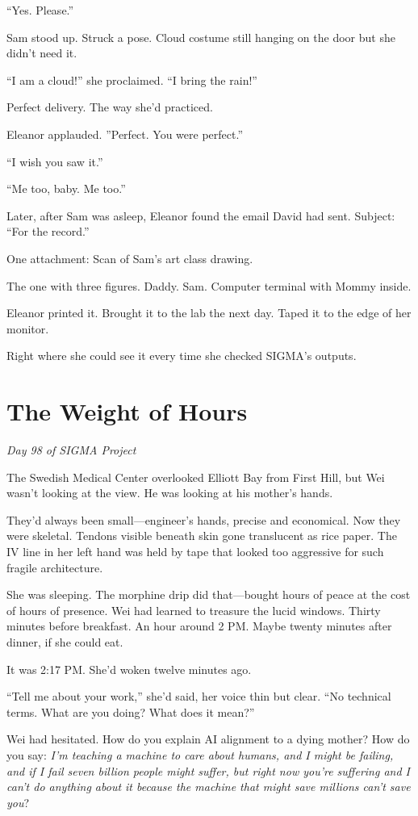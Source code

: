 ``Yes. Please.''

Sam stood up. Struck a pose. Cloud costume still hanging on the door but she didn't need it.

``I am a cloud!'' she proclaimed. ``I bring the rain!''

Perfect delivery. The way she'd practiced.

Eleanor applauded. ''Perfect. You were perfect.''

``I wish you saw it.''

``Me too, baby. Me too.''

Later, after Sam was asleep, Eleanor found the email David had sent. Subject: ``For the record.''

One attachment: Scan of Sam's art class drawing.

The one with three figures. Daddy. Sam. Computer terminal with Mommy inside.

Eleanor printed it. Brought it to the lab the next day. Taped it to the edge of her monitor.

Right where she could see it every time she checked SIGMA's outputs.

\scenebreak


\section{The Weight of Hours}

\emph{Day 98 of SIGMA Project}

The Swedish Medical Center overlooked Elliott Bay from First Hill, but Wei wasn't looking at the view. He was looking at his mother's hands.

They'd always been small---engineer's hands, precise and economical. Now they were skeletal. Tendons visible beneath skin gone translucent as rice paper. The IV line in her left hand was held by tape that looked too aggressive for such fragile architecture.

She was sleeping. The morphine drip did that---bought hours of peace at the cost of hours of presence. Wei had learned to treasure the lucid windows. Thirty minutes before breakfast. An hour around 2 PM. Maybe twenty minutes after dinner, if she could eat.

It was 2:17 PM. She'd woken twelve minutes ago.

``Tell me about your work,'' she'd said, her voice thin but clear. ``No technical terms. What are you doing? What does it mean?''

Wei had hesitated. How do you explain AI alignment to a dying mother? How do you say: \emph{I'm teaching a machine to care about humans, and I might be failing, and if I fail seven billion people might suffer, but right now you're suffering and I can't do anything about it because the machine that might save millions can't save you}?

